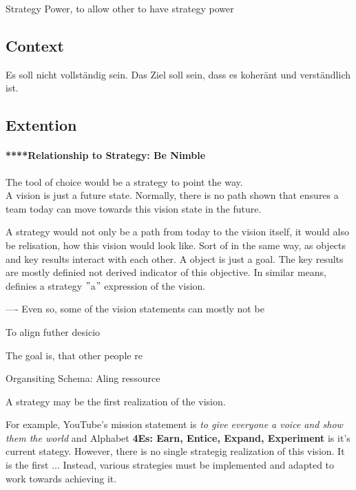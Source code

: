 Strategy Power, to allow other to have strategy power


\subsection{Context}
Es soll nicht vollständig sein.
Das Ziel soll sein, dass es koheränt und verständlich ist.

\subsection{Extention}


\paragraph{****Relationship to Strategy: Be Nimble}
The tool of choice would be a strategy to point the way.\\

A vision is just a future state. Normally, there is no path shown that ensures a team today can move towards this vision state in the future. 

A strategy would not only be a path from today to the vision itself, it would also be relisation, how this vision would look like. Sort of in the same way, as objects and key results interact with each other. A object is just a goal. The key results are mostly definied not derived indicator of this objective. In similar means, definies a strategy $"$a$"$ expression of the vision.

----
Even so, some of the vision statements can mostly not be 

To align futher desicio




The goal is, that other people re

Organsiting Schema: Aling ressource

A strategy may be the first realization of the vision.


For example, YouTube's mission statement is \textit{to give everyone a voice and show them the world} and Alphabet \textbf{4Es: Earn, Entice, Expand, Experiment} is it's current stategy. However, there is no single strategig realization of this vision. It is the first  
...
Instead, various strategies must be implemented and adapted to work towards achieving it.


